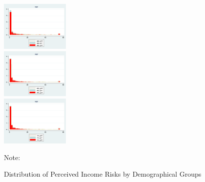 \documentclass[]{article}
\begin{document}
\begin{figure}[ht]
	
	\centering
	\caption{Distribution of Perceived Income Risks by Demographical Groups}
	\label{SCEPopHist_byGroup}
	\includegraphics[width=0.3\textwidth]{figures/hist_var_age_g.png} \\
	\includegraphics[width=0.3\textwidth]{figures/hist_var_edu_g.png} \\
	\includegraphics[width=0.3\textwidth]{figures/hist_var_inc_g.png}
	\begin{flushleft}
		{\footnotesize Note: }
	\end{flushleft}
	
\end{figure}



\end{document}

